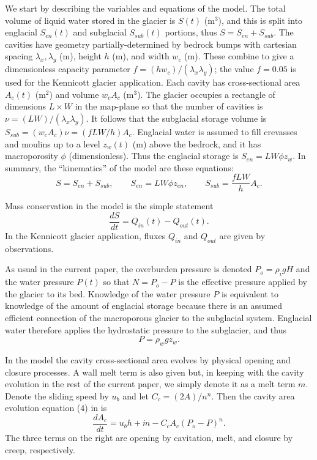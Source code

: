 \documentclass[11pt,final]{amsart}
\begin{document}
We start by describing the variables and equations of the \cite{Bartholomausetal2011} model.  The total volume of liquid water stored in the glacier is $S(t)$ (m$^3$), and this is split into englacial $S_{en}(t)$ and subglacial $S_{sub}(t)$ portions, thus $S=S_{en}+S_{sub}$.  The cavities have geometry partially-determined by bedrock bumps with cartesian spacing $\lambda_x,\lambda_y$ (m), height $h$ (m), and width $w_c$ (m).  These combine to give a dimensionless capacity parameter $f=(h w_c)/(\lambda_x \lambda_y)$; the value $f=0.05$ is used for the Kennicott glacier application.  Each cavity has cross-sectional area $A_c(t)$ (m$^2$) and volume $w_c A_c$ (m$^3$).  The glacier occupies a rectangle of dimensions $L\times W$ in the map-plane so that the number of cavities is $\nu = (LW)/(\lambda_x\lambda_y)$.  It follows that the subglacial storage volume is $S_{sub} = (w_c A_c) \nu = (f L W/h) A_c$.  Englacial water is assumed to fill crevasses and moulins up to a level $z_w(t)$ (m) above the bedrock, and it has macroporosity $\phi$ (dimensionless).  Thus the englacial storage is $S_{en}=L W \phi z_w$.  In summary, the ``kinematics'' of the \cite{Bartholomausetal2011} model are these equations:
\begin{equation}
S = S_{en} + S_{sub}, \qquad S_{en} = L W \phi z_{en}, \qquad S_{sub} = \frac{f L W}{h} A_c.  \label{eq:barth:kinematics}
\end{equation}

Mass conservation in the model is the simple statement  \citep{Bartholomausetal2008}
\begin{equation}
\frac{dS}{dt} = Q_{in}(t) - Q_{out}(t). \label{eq:barth:massconserve}
\end{equation}
In the Kennicott glacier application, fluxes $Q_{in}$ and $Q_{out}$ are given by observations.

As usual in the current paper, the overburden pressure is denoted $P_o=\rho_i g H$ and the water pressure $P(t)$ so that $N=P_o-P$ is the effective pressure applied by the glacier to its bed.  Knowledge of the water pressure $P$ is equivalent to knowledge of the amount of englacial storage because there is an assumed efficient connection of the macroporous glacier to the subglacial system.  Englacial water therefore applies the hydrostatic pressure to the subglacier, and thus
\begin{equation}
P = \rho_w g z_w.  \label{eq:barth:englacialpressure}
\end{equation}

In the \cite{Bartholomausetal2011} model the cavity cross-sectional area evolves by physical opening and closure processes.  A wall melt term is also given but, in keeping with the cavity evolution in the rest of the current paper, we simply denote it as a melt term $\dot m$.  Denote the sliding speed by $u_b$ and let $C_c = (2 A)/n^n$.  Then the cavity area evolution equation (4) in \cite{Bartholomausetal2011} is
\begin{equation}
\frac{dA_c}{dt} = u_b h + \dot m - C_c A_c (P_o-P)^n.  \label{eq:barth:cavityevolution}
\end{equation}
The three terms on the right are opening by cavitation, melt, and closure by creep, respectively.
\end{document}
